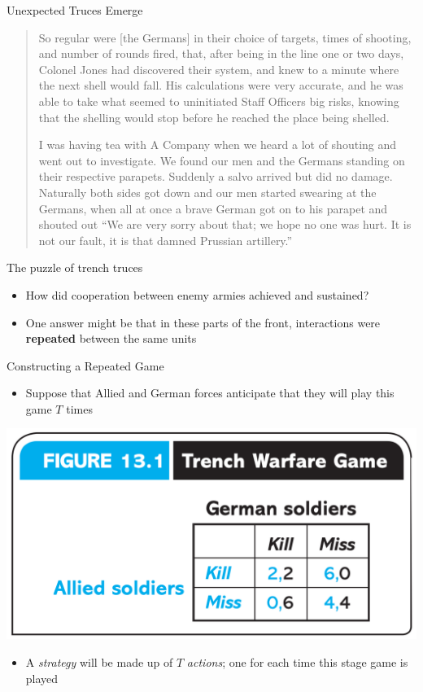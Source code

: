 \begin{frame}{Unexpected Truces Emerge}
  \begin{quote}
    \footnotesize 

    So regular were [the Germans] in their choice of targets, times of shooting, and number of rounds fired, that, after being in the line one or two days, Colonel Jones had discovered their system, and knew to a minute where the next shell would fall. His calculations were very accurate, and he was able to take what seemed to uninitiated Staff Officers big risks, knowing that the shelling would stop before he reached the place being shelled.

    I was having tea with A Company when we heard a lot of shouting and went out to investigate. We found our men and the Germans standing on their respective parapets. Suddenly a salvo arrived but did no damage. Naturally both sides got down and our men started swearing at the Germans, when all at once a brave German got on to his parapet and shouted out “We are very sorry about that; we hope no one was hurt. It is not our fault, it is that damned Prussian artillery.”
  \end{quote} 
\end{frame}

\begin{frame}{The puzzle of trench truces}
  \begin{itemize}
    \item How did cooperation between enemy armies achieved and sustained?
    \item One answer might be that in these parts of the front, interactions were \textbf{repeated} between the same units
  \end{itemize} 
\end{frame}

\begin{frame}{Constructing a Repeated Game}
  \begin{itemize}
    \item Suppose that Allied and German forces anticipate that they will play this game $T$ times 
  \end{itemize}
  \begin{center}
    \includegraphics[width=.5\textwidth]{figures/fig131.png}  
  \end{center}
  \begin{itemize}
    \item A \textit{strategy} will be made up of $T$ \textit{actions}; 
    one for each time this stage game is played
  \end{itemize}
\end{frame}

